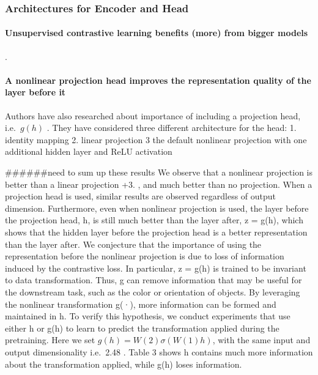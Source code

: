\documentclass[
]{krantz}
\begin{document}
\hypertarget{architectures-for-encoder-and-head}{%
\subsubsection{Architectures for Encoder and Head}\label{architectures-for-encoder-and-head}}

\hypertarget{unsupervised-contrastive-learning-benefits-more-from-bigger-models}{%
\paragraph{Unsupervised contrastive learning benefits (more) from bigger models}\label{unsupervised-contrastive-learning-benefits-more-from-bigger-models}}

.

\hypertarget{a-nonlinear-projection-head-improves-the-representation-quality-of-the-layer-before-it}{%
\paragraph{A nonlinear projection head improves the representation quality of the layer before it}\label{a-nonlinear-projection-head-improves-the-representation-quality-of-the-layer-before-it}}

Authors have also researched about importance of including a projection head, i.e.~\(g\left( h \right)\) . They have considered three different architecture for the head:
1. identity mapping
2. linear projection
3 the default nonlinear projection with one additional hidden layer and ReLU activation

\#\#\#\#\#\#need to sum up these results
We observe that a nonlinear projection is better than a linear projection +3. , and much better than no projection. When a projection head is used, similar results are observed regardless of output dimension. Furthermore, even when nonlinear projection is used, the layer before the projection head, h, is still much better than the layer after, z = g(h), which shows that the hidden layer before the projection head is a better representation than the layer after.
We conjecture that the importance of using the representation before the nonlinear projection is due to loss of information induced by the contrastive loss. In particular, z = g(h) is trained to be invariant to data transformation. Thus, g can remove information that may be useful for the downstream task, such as the color or orientation of objects. By leveraging the nonlinear transformation g(·), more information can be formed and maintained in h. To verify this hypothesis, we conduct experiments that use either h or g(h) to learn to predict the transformation applied during the pretraining. Here we set \(g(h) = W (2)\sigma(W (1)h)\), with the same input and output dimensionality i.e.~2.48 . Table 3 shows h contains much more information about the transformation applied, while g(h) loses information.
\end{document}
